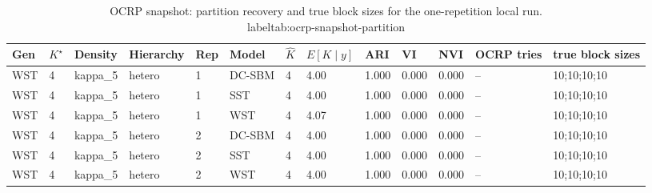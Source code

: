 \begin{table}[!h]
\centering
\caption{OCRP snapshot: partition recovery and true block sizes for the one-repetition local run.\\label{tab:ocrp-snapshot-partition}}
\centering
\begin{tabular}[t]{lllllllllllll}
\toprule
Gen & $K^\star$ & Density & Hierarchy & Rep & Model & $\hat K$ & $E[K\mid y]$ & ARI & VI & NVI & OCRP tries & true block sizes\\
\midrule
WST & 4 & kappa_5 & hetero & 1 & DC-SBM & 4 & 4.00 & 1.000 & 0.000 & 0.000 & -- & 10;10;10;10\\
WST & 4 & kappa_5 & hetero & 1 & SST & 4 & 4.00 & 1.000 & 0.000 & 0.000 & -- & 10;10;10;10\\
WST & 4 & kappa_5 & hetero & 1 & WST & 4 & 4.07 & 1.000 & 0.000 & 0.000 & -- & 10;10;10;10\\
WST & 4 & kappa_5 & hetero & 2 & DC-SBM & 4 & 4.00 & 1.000 & 0.000 & 0.000 & -- & 10;10;10;10\\
WST & 4 & kappa_5 & hetero & 2 & SST & 4 & 4.00 & 1.000 & 0.000 & 0.000 & -- & 10;10;10;10\\
WST & 4 & kappa_5 & hetero & 2 & WST & 4 & 4.00 & 1.000 & 0.000 & 0.000 & -- & 10;10;10;10\\
\bottomrule
\end{tabular}
\end{table}
